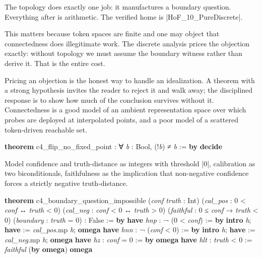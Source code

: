 \documentclass{memoir}
\begin{document}
The topology does exactly one job: it manufactures a boundary question.
Everything after is arithmetic. The verified home is \LeanVerb|HoF_10_PureDiscrete|.

This matters because token spaces are finite and one may object that
connectedness does illegitimate work. The discrete analysis prices the objection
exactly: without topology we must assume the boundary witness rather than derive
it. That is the entire cost.

Pricing an objection is the honest way to handle an idealization. A theorem with
a strong hypothesis invites the reader to reject it and walk away; the
disciplined response is to show how much of the conclusion survives without it.
Connectedness is a good model of an ambient representation space over which
probes are deployed at interpolated points, and a poor model of a scattered
token-driven reachable set.

\begin{LeanVerbatim}
\textbf{theorem} c4_flip_no_fixed_point : ∀ \textit{b} : Bool, (!\textit{b}) ≠ \textit{b} :=
  \textbf{by} \textbf{decide}

\end{LeanVerbatim}


Model confidence and truth-distance as integers with threshold \LeanVerb|0|, calibration
as two biconditionals, faithfulness as the implication that non-negative
confidence forces a strictly negative truth-distance.

\begin{LeanVerbatim}
\textbf{theorem} c4_boundary_question_impossible
    (\textit{conf} \textit{truth} : Int)
    (\textit{cal_pos} : 0 < \textit{conf} ↔ \textit{truth} < 0)
    (\textit{cal_neg} : \textit{conf} < 0 ↔ \textit{truth} > 0)
    (\textit{faithful} : 0 ≤ \textit{conf} → \textit{truth} < 0)
    (\textit{boundary} : \textit{truth} = 0) : False := \textbf{by}
  \textbf{have} \textit{hnp} : ¬ (0 < \textit{conf}) := \textbf{by}
    \textbf{intro} \textit{h}; \textbf{have} := \textit{cal_pos}.mp \textit{h}; \textbf{omega}
  \textbf{have} \textit{hnn} : ¬ (\textit{conf} < 0) := \textbf{by}
    \textbf{intro} \textit{h}; \textbf{have} := \textit{cal_neg}.mp \textit{h}; \textbf{omega}
  \textbf{have} \textit{hz} : \textit{conf} = 0 := \textbf{by} \textbf{omega}
  \textbf{have} \textit{hlt} : \textit{truth} < 0 := \textit{faithful} (\textbf{by} \textbf{omega})
  \textbf{omega}

\end{LeanVerbatim}
\end{document}
